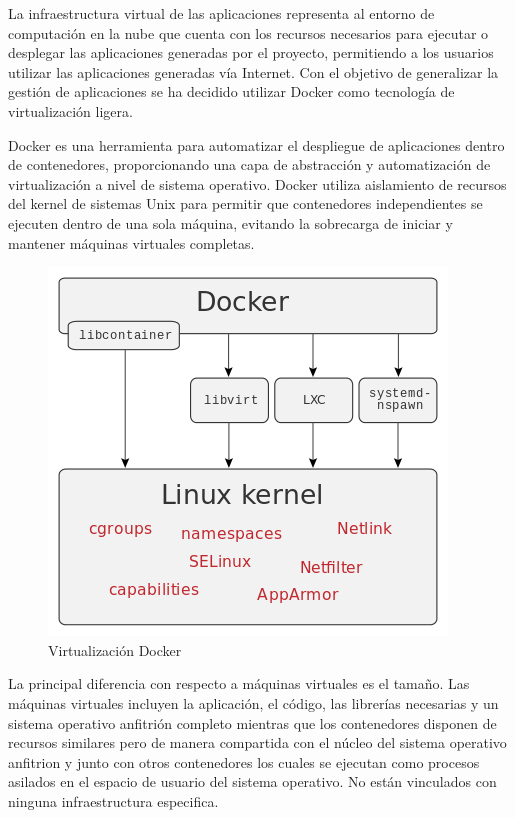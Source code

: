 \documentclass[a4paper,11pt]{book}
\begin{document}
La infraestructura virtual de las aplicaciones  representa al entorno de computación en la nube que cuenta con los recursos necesarios para ejecutar o desplegar las aplicaciones generadas por el proyecto, permitiendo a los usuarios utilizar las aplicaciones generadas vía Internet.
Con el objetivo de generalizar la gestión de aplicaciones  se ha decidido utilizar Docker como tecnología de virtualización ligera.

Docker\cite{dk} es una herramienta para automatizar el despliegue de aplicaciones dentro de contenedores, proporcionando una capa de abstracción y automatización de virtualización a nivel de sistema operativo. Docker utiliza aislamiento de recursos del kernel de sistemas Unix  para permitir que contenedores independientes se ejecuten dentro de una sola máquina, evitando la sobrecarga de iniciar y mantener máquinas virtuales completas.

\begin{figure}[H]
\centering
\includegraphics[scale=0.35]{imagenes/docker.png}
\caption{ Virtualización Docker\cite{dkw}}
\end{figure}

La principal diferencia con respecto a máquinas virtuales es el tamaño. Las máquinas virtuales incluyen la aplicación, el código, las librerías necesarias y un sistema operativo anfitrión completo mientras que los contenedores disponen de recursos similares pero de manera compartida con el núcleo  del sistema operativo anfitrion y junto con otros contenedores los cuales se ejecutan  como procesos asilados en el espacio de usuario del sistema operativo. No están vinculados con ninguna infraestructura especifica.
\end{document}
